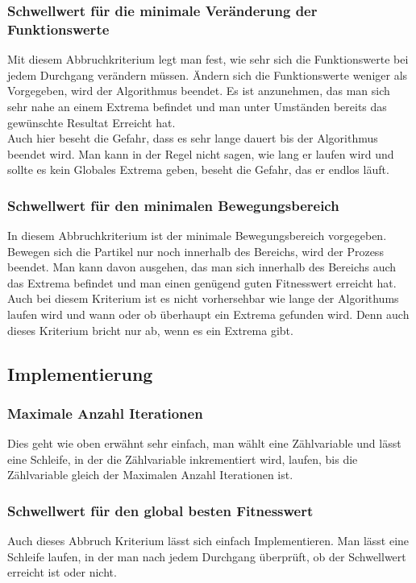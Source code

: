 \subsubsection{Schwellwert für die minimale Veränderung der Funktionswerte}
Mit diesem Abbruchkriterium legt man fest, wie sehr sich die Funktionswerte bei jedem Durchgang verändern müssen. Ändern sich die Funktionswerte weniger als Vorgegeben, wird der Algorithmus beendet. Es ist anzunehmen, das man sich sehr nahe an einem Extrema befindet und man unter Umständen bereits das gewünschte Resultat Erreicht hat.\\ 
Auch hier beseht die Gefahr, dass es sehr lange dauert bis der Algorithmus beendet wird. Man kann in der Regel nicht sagen, wie lang er laufen wird und sollte es kein Globales Extrema geben, beseht die Gefahr, das er endlos läuft. 

\subsubsection{Schwellwert für den minimalen Bewegungsbereich}
In diesem Abbruchkriterium ist der minimale Bewegungsbereich vorgegeben. Bewegen sich die Partikel nur noch innerhalb des Bereichs, wird der Prozess beendet. Man kann davon ausgehen, das man sich innerhalb des Bereichs auch das Extrema befindet und man einen genügend guten Fitnesswert erreicht hat.\\
Auch bei diesem Kriterium ist es nicht vorhersehbar wie lange der Algorithums laufen wird und wann oder ob überhaupt ein Extrema gefunden wird. Denn auch dieses Kriterium bricht nur ab, wenn es ein Extrema gibt.

\subsection{Implementierung}
\subsubsection{Maximale Anzahl Iterationen}
Dies geht wie oben erwähnt sehr einfach, man wählt eine Zählvariable und lässt eine Schleife, in der die Zählvariable inkrementiert wird, laufen, bis die Zählvariable gleich der Maximalen Anzahl Iterationen ist.

\subsubsection{Schwellwert für den global besten Fitnesswert}
Auch dieses Abbruch Kriterium lässt sich einfach Implementieren. Man lässt eine Schleife laufen, in der man nach jedem Durchgang überprüft, ob der Schwellwert erreicht ist oder nicht. 

